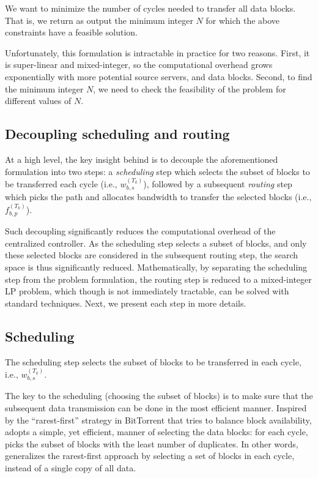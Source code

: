  We want to minimize the number of cycles needed to
transfer all data blocks. That is, we return as output the minimum
integer $N$ for which the above constraints have a feasible solution.

Unfortunately, this formulation is intractable in practice for two
reasons. First, it is super-linear and mixed-integer, so the
computational overhead grows exponentially with more potential source
servers, and data blocks. Second, to find the minimum integer $N$, we
need to check the feasibility of the problem for different values of
$N$.

\subsection{Decoupling scheduling and routing}
\label{subsec:logic:separation}

At a high level, the key insight behind \name is to decouple the
aforementioned formulation into two steps: a {\em scheduling} step
which selects the subset of blocks to be transferred each cycle
(i.e., $w^{(T_k)}_{b,s}$), followed by a subsequent {\em routing}
step which picks the path and allocates bandwidth to transfer the
selected blocks (i.e.,
$f_{b,p}^{(T_k)}$).

Such decoupling significantly reduces the computational overhead of
the centralized controller. As the scheduling step selects a subset
of blocks, and only these selected blocks are considered in the
subsequent routing step, the search space is thus significantly
reduced. Mathematically, by separating the scheduling step from the
problem formulation, the routing step is reduced to a mixed-integer
LP problem, which though is not immediately tractable, can be solved
with standard techniques. Next, we present each step in more details.

\subsection{Scheduling}
\label{subsec:logic:scheduling}

The scheduling step selects the subset of blocks to be transferred in
each cycle, i.e., $w^{(T_k)}_{b,s}$.

The key to the scheduling (choosing the subset of blocks) is to make sure that the subsequent data transmission can be done in the most efficient manner. Inspired by the ``rarest-first'' strategy in BitTorrent \cite{Cohen2003Incentives} that tries to balance block availability, \name adopts a simple, yet efficient, manner of selecting the data blocks: for each cycle, \name picks the subset of blocks with the least number of duplicates. In other words, \name generalizes the rarest-first approach by selecting a set of blocks in each cycle, instead of a single copy of all data.

